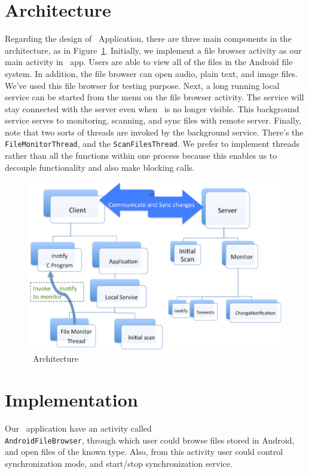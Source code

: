 \section{Architecture}
\label{sec:Architecture}
Regarding the design of \teledroid\ Application, there are three main components in the architecture, as in 
Figure~\ref{fig:architecture}. Initially, we implement a file browser activity as our main activity in \teledroid\ app. 
Users are able to view all of the files in the Android file system. In addition, the file browser can open 
audio, plain text, and image files. We've used this file browser for testing purpose. Next, a long running local 
service can be started from the menu on the file browser activity. The service will stay connected with the server even when 
\teledroid\ is no longer visible. This background service serves to monitoring, scanning, and 
sync files with remote server. Finally, note that two sorts of threads are invoked by the background service. 
There's the \verb+FileMonitorThread+, and the \verb+ScanFilesThread+. We prefer to implement threads rather than all the
functions within one process because this enables us to decouple functionality and also make blocking calls.

\begin{figure}[htp]
\centering
\includegraphics[scale=0.35]{architecture}
\caption{\teledroid\ Architecture}\label{fig:architecture}
\end{figure}

\section{Implementation}
\label{sec:Implementation}
Our \teledroid\ application have an activity called \\ \verb+AndroidFileBrowser+, through which user could browse files stored in 
Android, and open files of the known type. Also, from this activity user could control synchronization mode, and start/stop 
synchronization service. 

